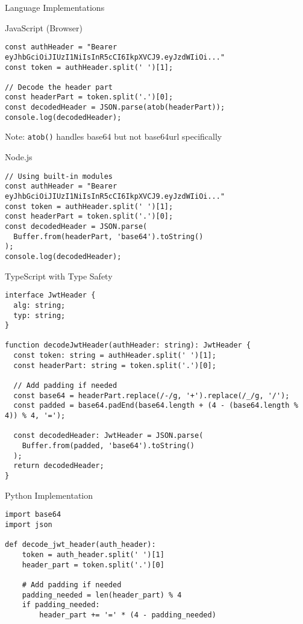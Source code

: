 \documentclass[presentation,aspectratio=169]{beamer}
\begin{document}
\begin{frame}[label={sec:orgcc4e74b},fragile]{Language Implementations}
 \begin{block}{JavaScript (Browser)}
\begin{verbatim}
const authHeader = "Bearer eyJhbGciOiJIUzI1NiIsInR5cCI6IkpXVCJ9.eyJzdWIiOi..."
const token = authHeader.split(' ')[1];

// Decode the header part
const headerPart = token.split('.')[0];
const decodedHeader = JSON.parse(atob(headerPart));
console.log(decodedHeader);
\end{verbatim}

\alert{Note}: \texttt{atob()} handles base64 but not base64url specifically
\end{block}
\begin{block}{Node.js}
\begin{verbatim}
// Using built-in modules
const authHeader = "Bearer eyJhbGciOiJIUzI1NiIsInR5cCI6IkpXVCJ9.eyJzdWIiOi..."
const token = authHeader.split(' ')[1];
const headerPart = token.split('.')[0];
const decodedHeader = JSON.parse(
  Buffer.from(headerPart, 'base64').toString()
);
console.log(decodedHeader);
\end{verbatim}
\end{block}
\begin{block}{TypeScript with Type Safety}
\begin{verbatim}
interface JwtHeader {
  alg: string;
  typ: string;
}

function decodeJwtHeader(authHeader: string): JwtHeader {
  const token: string = authHeader.split(' ')[1];
  const headerPart: string = token.split('.')[0];

  // Add padding if needed
  const base64 = headerPart.replace(/-/g, '+').replace(/_/g, '/');
  const padded = base64.padEnd(base64.length + (4 - (base64.length % 4)) % 4, '=');

  const decodedHeader: JwtHeader = JSON.parse(
    Buffer.from(padded, 'base64').toString()
  );
  return decodedHeader;
}
\end{verbatim}
\end{block}
\begin{block}{Python Implementation}
\begin{verbatim}
import base64
import json

def decode_jwt_header(auth_header):
    token = auth_header.split(' ')[1]
    header_part = token.split('.')[0]

    # Add padding if needed
    padding_needed = len(header_part) % 4
    if padding_needed:
        header_part += '=' * (4 - padding_needed)


\end{verbatim}
\end{block}
\end{frame}
\end{document}
